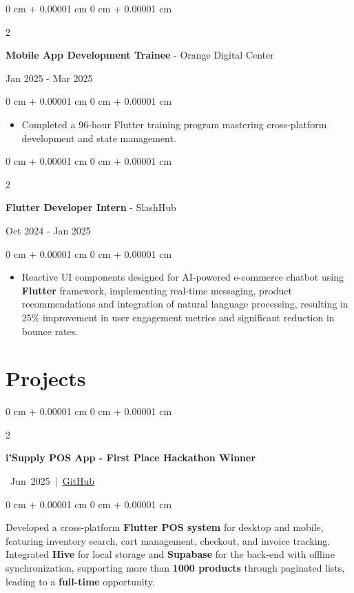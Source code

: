 \documentclass[10pt, letterpaper]{article}
\newenvironment{highlights}{
\begin{itemize}[
topsep=0.10 cm,
parsep=0.10 cm,
partopsep=0pt,
itemsep=0pt,
leftmargin=0 cm + 10pt
]
}{
\end{itemize}
} %
\newenvironment{onecolentry}{
\begin{adjustwidth}{
0 cm + 0.00001 cm
}{
0 cm + 0.00001 cm
}
}{
\end{adjustwidth}
} %
\newenvironment{twocolentry}[2][]{
\onecolentry
\def\secondColumn{#2}
\setcolumnwidth{\fill, 4.5 cm}
\begin{paracol}{2}
}{
\switchcolumn \raggedleft \secondColumn
\end{paracol}
\endonecolentry
} %
\let\hrefWithoutArrow\href
\begin{document}
 \begin{samepage}

\begin{twocolentry}{
Jan 2025 - Mar 2025
}
\textbf{\large Mobile App Development Trainee} - Orange Digital Center
\end{twocolentry}
\vspace{0.1 cm}
\begin{onecolentry}
\begin{highlights}
\item Completed a 96-hour Flutter training program mastering cross-platform development and state management.
\end{highlights}
\end{onecolentry}
\end{samepage}

\vspace{0.2 cm}
 \begin{samepage}

\begin{twocolentry}{
Oct 2024 - Jan 2025
}
\textbf{\large Flutter Developer Intern} - SlashHub
\end{twocolentry}
\vspace{0.1 cm}
\begin{onecolentry}
\begin{highlights}
\item Reactive UI components designed for AI-powered e-commerce chatbot using \textbf{Flutter} framework, implementing real-time messaging, product recommendations and integration of natural language processing, resulting in 25\% improvement in user engagement metrics and significant reduction in bounce rates.
\end{highlights}
\end{onecolentry}
\end{samepage}

\newpage

\section{Projects}

\vspace{0.10 cm}
 \begin{samepage}

\begin{twocolentry}{
\mbox{
Jun 2025 | \hrefWithoutArrow{https://github.com/KarimmYasser/isupply_app}{GitHub}}%
}
\textbf{i'Supply POS App - First Place Hackathon Winner}
\end{twocolentry}

\begin{onecolentry}
\begin{highlights}
Developed a cross-platform \textbf{Flutter POS system} for desktop and mobile, featuring inventory search, cart management, checkout, and invoice tracking. Integrated \textbf{Hive} for local storage and \textbf{Supabase} for the back-end with offline synchronization, supporting more than \textbf{1000 products} through paginated lists, leading to a \textbf{full-time} opportunity.
\end{highlights}
\end{onecolentry}
\end{samepage}
\end{document}
